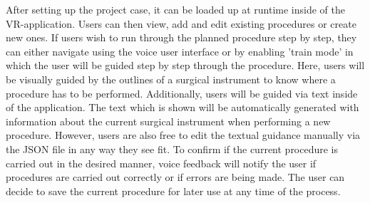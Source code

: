 After setting up the project case, it can be loaded up at runtime inside of the VR-application.
Users can then view, add and edit existing procedures or create new ones.
If users wish to run through the planned procedure step by step, they can either navigate using the voice user interface or by enabling 'train mode' in which the user will be guided step by step through the procedure.
Here, users will be visually guided by the outlines of a surgical instrument to know where a procedure has to be performed.
Additionally, users will be guided via text inside of the application.
The text which is shown will be automatically generated with information about the current surgical instrument when performing a new procedure.
However, users are also free to edit the textual guidance manually via the JSON file in any way they see fit.
To confirm if the current procedure is carried out in the desired manner, voice feedback will notify the user if procedures are carried out correctly or if errors are being made.
The user can decide to save the current procedure for later use at any time of the process.
